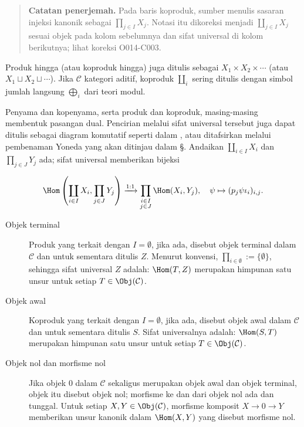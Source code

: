 \begin{quote}\small
\textbf{Catatan penerjemah.} Pada baris koproduk, sumber menulis sasaran
injeksi kanonik sebagai $\prod_{j \in I}X_j$. Notasi itu dikoreksi menjadi
$\coprod_{j \in I}X_j$ sesuai objek pada kolom sebelumnya dan sifat universal
di kolom berikutnya; lihat koreksi O014-C003.
\end{quote}

Produk hingga (atau koproduk hingga) juga ditulis sebagai
$X_1 \times X_2 \times \cdots$ (atau $X_1 \sqcup X_2 \sqcup \cdots$). Jika
$\mathcal{C}$ kategori aditif, koproduk $\coprod_i$ sering ditulis dengan
simbol jumlah langsung $\bigoplus_i$ dari teori modul.

Penyama dan kopenyama, serta produk dan koproduk, masing-masing membentuk
pasangan dual.
Pencirian melalui sifat universal tersebut juga dapat ditulis sebagai diagram
komutatif seperti dalam \cite[\S~2.7]{Li1}, atau ditafsirkan melalui pembenaman
Yoneda yang akan ditinjau dalam \S{}. Andaikan
$\coprod_{i \in I} X_i$ dan $\prod_{j \in J} Y_j$ ada; sifat universal
memberikan bijeksi

\[ \Hom\left( \coprod_{i \in I} X_i, \prod_{j \in J} Y_j \right)
\xrightarrow{1:1} \prod_{\substack{i \in I \\ j \in J}} \Hom(X_i, Y_j),
\quad \psi \mapsto (p_j \psi \iota_i)_{i,j} . \]

\begin{description}
	\item[Objek terminal] Produk yang terkait dengan $I = \emptyset$, jika ada,
	disebut objek terminal dalam $\mathcal{C}$ dan untuk sementara ditulis $Z$.
	Menurut konvensi, $\prod_{i \in \emptyset} := \{\emptyset\}$, sehingga
	sifat universal $Z$ adalah: $\Hom(T, Z)$ merupakan himpunan satu unsur untuk
	setiap $T \in \Obj(\mathcal{C})$.
	\item[Objek awal] Koproduk yang terkait dengan $I = \emptyset$, jika ada,
	disebut objek awal dalam $\mathcal{C}$ dan untuk sementara ditulis $S$.
	Sifat universalnya adalah: $\Hom(S, T)$ merupakan himpunan satu unsur untuk
	setiap $T \in \Obj(\mathcal{C})$.
	\item[Objek nol dan morfisme nol] Jika objek $0$ dalam $\mathcal{C}$ sekaligus
	merupakan objek awal dan objek terminal, objek itu disebut objek nol;
	morfisme ke dan dari objek nol ada dan tunggal. Untuk setiap
	$X, Y \in \Obj(\mathcal{C})$, morfisme komposit $X \to 0 \to Y$
	memberikan unsur kanonik dalam $\Hom(X, Y)$ yang disebut morfisme nol.
\end{description}

